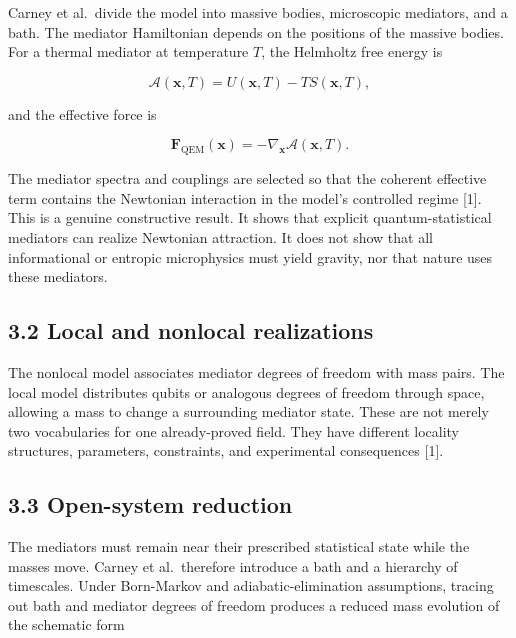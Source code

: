 \documentclass[
  american,
  11pt,
  letterpaper,
]{article}
\begin{document}
Carney et al.~divide the model into massive bodies, microscopic mediators, and a bath. The mediator Hamiltonian depends on the positions of the massive bodies. For a thermal mediator at temperature \(T\), the Helmholtz free energy is

\begin{equation}
\mathcal{A}(\mathbf{x},T)=U(\mathbf{x},T)-T S(\mathbf{x},T),
\tag{1}
\end{equation}

and the effective force is

\begin{equation}
\mathbf{F}_{\mathrm{QEM}}(\mathbf{x})=-\nabla_{\mathbf{x}}\mathcal{A}(\mathbf{x},T).
\tag{2}
\end{equation}

The mediator spectra and couplings are selected so that the coherent effective term contains the Newtonian interaction in the model's controlled regime {[}1{]}. This is a genuine constructive result. It shows that explicit quantum-statistical mediators can realize Newtonian attraction. It does not show that all informational or entropic microphysics must yield gravity, nor that nature uses these mediators.

\subsection{3.2 Local and nonlocal realizations}\label{local-and-nonlocal-realizations}

The nonlocal model associates mediator degrees of freedom with mass pairs. The local model distributes qubits or analogous degrees of freedom through space, allowing a mass to change a surrounding mediator state. These are not merely two vocabularies for one already-proved field. They have different locality structures, parameters, constraints, and experimental consequences {[}1{]}.

\subsection{3.3 Open-system reduction}\label{open-system-reduction}

The mediators must remain near their prescribed statistical state while the masses move. Carney et al.~therefore introduce a bath and a hierarchy of timescales. Under Born-Markov and adiabatic-elimination assumptions, tracing out bath and mediator degrees of freedom produces a reduced mass evolution of the schematic form
\end{document}
